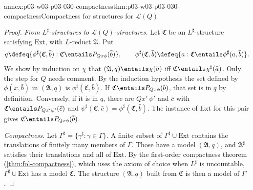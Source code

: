 \begin{annexitem}{annex:p03-w03-p03-030-compactness}{thm:p03-w03-p03-030-compactness}{Compactness for structures for \(\mathscr L(Q)\)}
\begin{proof}
\emph{From \(L^\sharp\)-structures to \(\mathscr L(Q)\)-structures.}  Let
\(\mathfrak C\) be an \(L^\sharp\)-structure satisfying \(\mathrm{Ext}\), with
\(L\)-reduct \(\mathfrak A\).  Put
\[
 q\defeq\{\phi^\sharp(\mathfrak C,\bar b):\mathfrak C\entails
 P_{Qx\phi}(\bar b)\},
 \qquad
 \phi^\sharp(\mathfrak C,\bar b)\defeq\{a:\mathfrak C\entails\phi^\sharp(a,\bar b)\}.
\]
We show by induction on \(\chi\) that \((\mathfrak A,q)\entails\chi(\bar a)\)
iff \(\mathfrak C\entails\chi^\sharp(\bar a)\).  Only the step for \(Q\)
needs comment.  By the induction hypothesis the set defined by
\(\phi(x,\bar b)\) in \((\mathfrak A,q)\) is \(\phi^\sharp(\mathfrak
C,\bar b)\).  If \(\mathfrak C\entails P_{Qx\phi}(\bar b)\), that set is in
\(q\) by definition.  Conversely, if it is in \(q\), there are
\(Qx'\,\psi'\) and \(\bar c\) with \(\mathfrak C\entails
P_{Qx'\psi'}(\bar c)\) and \(\psi^\sharp(\mathfrak C,\bar c)=\phi^\sharp(\mathfrak
C,\bar b)\).  The instance of \(\mathrm{Ext}\) for this pair gives
\(\mathfrak C\entails P_{Qx\phi}(\bar b)\).

\emph{Compactness.}  Let \(\Gamma^\sharp=\{\gamma^\sharp:\gamma\in\Gamma\}\).
A finite subset of \(\Gamma^\sharp\cup\mathrm{Ext}\) contains the
translations of finitely many members of \(\Gamma\).  Those have a model
\((\mathfrak A,q)\), and \(\mathfrak A^\sharp\) satisfies their translations
and all of \(\mathrm{Ext}\).  By the first-order compactness theorem
(\cref{thm:fol-compactness}), which uses the axiom of choice when \(L^\sharp\)
is uncountable, \(\Gamma^\sharp\cup\mathrm{Ext}\) has a model \(\mathfrak C\).
The structure \((\mathfrak A,q)\) built from \(\mathfrak C\) is then a model
of \(\Gamma\).
\end{proof}
\end{annexitem}

